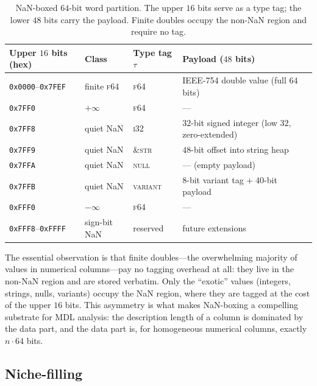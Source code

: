 \documentclass[10pt]{article}
\theoremstyle{definition}
\theoremstyle{remark}
\begin{document}
\begin{table}[h]
\centering
\caption{NaN-boxed $64$-bit word partition. The upper $16$ bits serve as
a type tag; the lower $48$ bits carry the payload. Finite doubles occupy
the non-NaN region and require no tag.}\label{tab:nanbox}
\begin{tabular}{@{}llll@{}}
\toprule
Upper $16$ bits (hex) & Class & Type tag $\tau$ & Payload ($48$ bits) \\
\midrule
\texttt{0x0000}--\texttt{0x7FEF} & finite \textsc{f64}    & \textsc{f64}     & IEEE-754 double value (full $64$ bits) \\
\texttt{0x7FF0}                  & $+\infty$               & \textsc{f64}     & --- \\
\texttt{0x7FF8}                  & quiet NaN               & \textsc{i32}     & $32$-bit signed integer (low $32$, zero-extended) \\
\texttt{0x7FF9}                  & quiet NaN               & \textsc{\&str}   & $48$-bit offset into string heap \\
\texttt{0x7FFA}                  & quiet NaN               & \textsc{null}    & --- (empty payload) \\
\texttt{0x7FFB}                  & quiet NaN               & \textsc{variant} & $8$-bit variant tag $+\;40$-bit payload \\
\texttt{0xFFF0}                  & $-\infty$               & \textsc{f64}     & --- \\
\texttt{0xFFF8}--\texttt{0xFFFF} & sign-bit NaN            & reserved         & future extensions \\
\bottomrule
\end{tabular}
\end{table}

The essential observation is that finite doubles---the overwhelming
majority of values in numerical columns---pay no tagging overhead at all:
they live in the non-NaN region and are stored verbatim. Only the
``exotic'' values (integers, strings, nulls, variants) occupy the NaN
region, where they are tagged at the cost of the upper $16$ bits. This
asymmetry is what makes NaN-boxing a compelling substrate for MDL
analysis: the description length of a column is dominated by the data
part, and the data part is, for homogeneous numerical columns, exactly
$n \cdot 64$ bits.

\subsection{Niche-filling}\label{sec:niche}
\end{document}
